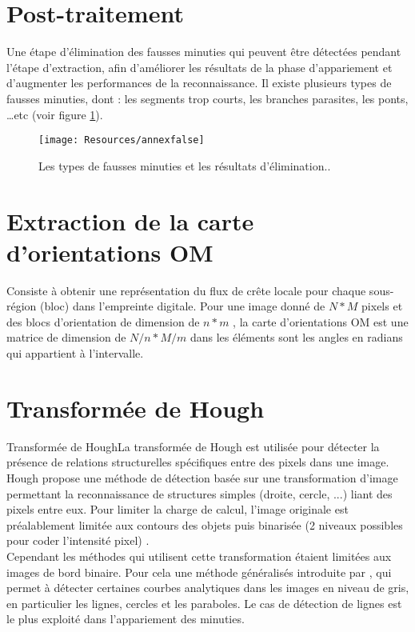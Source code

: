\section{Post-traitement}
\label{posttrait}
Une étape d'élimination des fausses minuties qui peuvent être détectées pendant l'étape d'extraction, afin d'améliorer les résultats de la phase d'appariement et d'augmenter les performances de la reconnaissance. Il existe plusieurs types de fausses minuties, dont : les segments trop courts, les branches parasites, les ponts, …etc (voir figure \ref{fig:annexfalse}).
\begin{center}
	\begin{figure}[H]
		\centering
		\texttt{[image: Resources/annexfalse]}
		\captionsetup{justification=centering}
		\caption{Les types de fausses minuties et les résultats d'élimination.\citep{maltoni2009handbook}.}
		\label{fig:annexfalse}
	\end{figure}
\end{center}
 
\section{Extraction de la carte d'orientations OM }
\label{carteOM}
Consiste à obtenir une représentation du flux de crête locale pour chaque sous-région (bloc) dans l'empreinte digitale. Pour une image donné de $ N*M $ pixels et des blocs d'orientation de dimension de $ n*m $ , la carte d'orientations OM est une matrice de dimension de $  N/n * M/m $ dans les éléments sont les angles en radians qui appartient à l'intervalle. 

\section{Transformée de Hough}
\label{Hough}
Transformée de HoughLa transformée de Hough est utilisée pour détecter la présence de relations structurelles spécifiques entre des pixels dans une image. Hough propose une méthode de détection basée sur une transformation d’image permettant la reconnaissance de structures simples (droite, cercle, ...) liant des pixels entre eux. Pour limiter la charge de calcul, l’image originale est préalablement limitée aux contours des objets puis binarisée (2 niveaux possibles pour coder l’intensité pixel) \citep{bergounioux2008quelques}.\\
Cependant les méthodes qui utilisent cette transformation étaient limitées aux images de bord binaire. Pour cela une méthode généralisés introduite par \citep{bergounioux2008quelques}, qui permet à détecter certaines courbes analytiques dans les images en niveau de gris, en particulier les lignes, cercles et les paraboles. Le cas de détection de lignes est le plus exploité dans l’appariement des minuties.
